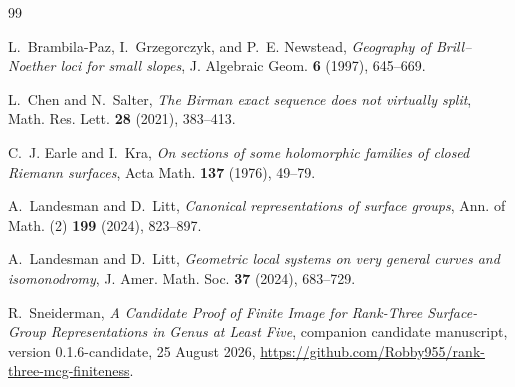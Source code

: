 \documentclass[11pt]{article}
\theoremstyle{definition}
\begin{document}
{\small
\begin{thebibliography}{99}

L.~Brambila-Paz, I.~Grzegorczyk, and P.~E. Newstead,
\emph{Geography of Brill--Noether loci for small slopes},
J. Algebraic Geom. \textbf{6} (1997), 645--669.

L.~Chen and N.~Salter,
\emph{The Birman exact sequence does not virtually split},
Math. Res. Lett. \textbf{28} (2021), 383--413.

C.~J. Earle and I.~Kra,
\emph{On sections of some holomorphic families of closed Riemann surfaces},
Acta Math. \textbf{137} (1976), 49--79.

A.~Landesman and D.~Litt,
\emph{Canonical representations of surface groups},
Ann. of Math. (2) \textbf{199} (2024), 823--897.

A.~Landesman and D.~Litt,
\emph{Geometric local systems on very general curves and isomonodromy},
J. Amer. Math. Soc. \textbf{37} (2024), 683--729.

R.~Sneiderman,
\emph{A Candidate Proof of Finite Image for Rank-Three Surface-Group
Representations in Genus at Least Five}, companion candidate manuscript,
version 0.1.6-candidate, 25 August 2026,
\url{https://github.com/Robby955/rank-three-mcg-finiteness}.

\end{thebibliography}
}
\end{document}
